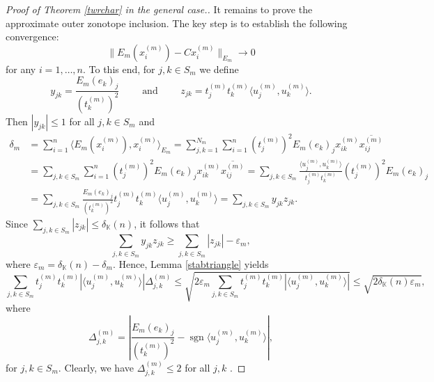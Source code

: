 \documentclass[12pt, reqno]{amsart}
\theoremstyle{definition}
\theoremstyle{remark}
\numberwithin{equation}{section}
\DeclareMathOperator{\sgn}{sgn}
\begin{document}
\begin{proof}[Proof of Theorem \ref{twrchar} in the general case.]
It remains to prove the approximate outer zonotope inclusion. The key step is to establish the following convergence:
\begin{equation}
\label{approxid}
\|E_m(x^{(m)}_i) - Cx^{(m)}_i\|_{E_m} \to 0
\end{equation}
for any $i=1, \ldots, n$. To this end, for $j, k \in S_m$ we define 
$$y_{jk} = \frac{E_m(e_k)_j}{(t^{(m)}_k)^2} \qquad \text{ and } \qquad z_{jk} = t^{(m)}_jt^{(m)}_k \langle u^{(m)}_j, u^{(m)}_k \rangle.$$
Then $|y_{jk}| \leq 1$ for all $j, k \in S_m$ and
\begin{align*}
\delta_m &= \sum_{i=1}^{n} \langle E_m(x^{(m)}_i), x^{(m)}_i \rangle_{E_m} = \sum_{j, k=1}^{N_m} \sum_{i=1}^{n} (t^{(m)}_j)^2E_m(e_k)_j x^{(m)}_{ik} \overline{x^{(m)}_{ij}} \\ 
&= \sum_{j, k \in S_m} \sum_{i=1}^{n} (t^{(m)}_j)^2E_m(e_k)_j x^{(m)}_{ik} \overline{x^{(m)}_{ij}}=\sum_{j, k \in S_m}  \frac{\langle u^{(m)}_j, u^{(m)}_k \rangle}{t^{(m)}_jt^{(m)}_k}(t^{(m)}_j)^2E_m(e_k)_j \\
&= \sum_{j, k \in S_m} \frac{E_m(e_k)_j}{(t^{(m)}_k)^2} t^{(m)}_jt^{(m)}_k \langle u^{(m)}_j, u^{(m)}_k \rangle = \sum_{j, k \in S_m} y_{jk} z_{jk}.
\end{align*}
Since $\sum_{j, k \in S_m} |z_{jk}| \leq \delta_{\mathbb{K}}(n)$, it follows that 
$$\sum_{j, k \in S_m} y_{jk} z_{jk}  \geq \sum_{j, k \in S_m} |z_{jk}| - \varepsilon_m,$$
where $\varepsilon_m = \delta_{\mathbb{K}}(n) - \delta_m$. Hence, Lemma \ref{stabtriangle} yields 
$$\sum_{j, k \in S_m}  t^{(m)}_jt^{(m)}_k |\langle u^{(m)}_j, u^{(m)}_k \rangle| \Delta^{(m)}_{j, k} \leq \sqrt{2 \varepsilon_m \sum_{j, k \in S_m} t^{(m)}_jt^{(m)}_k |\langle u^{(m)}_j, u^{(m)}_k \rangle| } \leq \sqrt{2\delta_{\mathbb{K}}(n) \varepsilon_m},$$
where 
$$\Delta^{(m)}_{j, k} = \left |\frac{E_m(e_k)_j}{(t^{(m)}_k)^2} - \sgn \langle u^{(m)}_j, u^{(m)}_k \rangle \right |,$$
for $j, k \in S_m$. Clearly, we have $\Delta^{(m)}_{j, k} \leq 2$ for all $j, k$ .


\end{proof}
\end{document}
